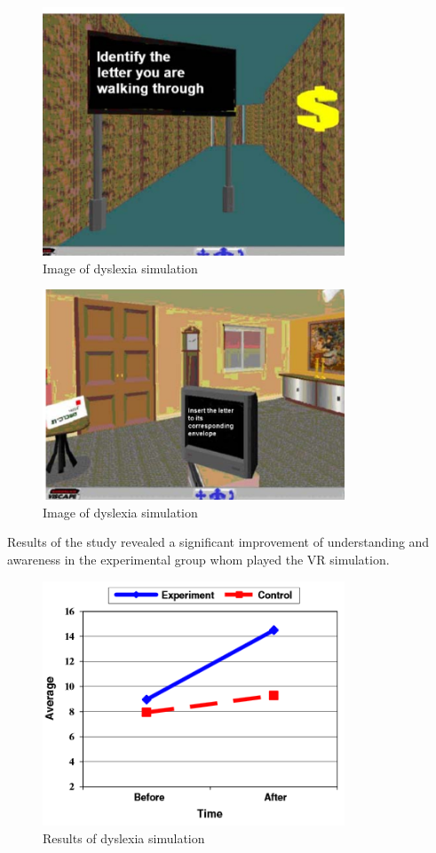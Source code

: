 \documentclass[11pt]{report}
\begin{document}
\begin{figure}[H]
\centering
\includegraphics[width=90mm]{images/litreview/dsim1.png}
\caption{Image of dyslexia simulation}
\label{autisim1}
\end{figure}

\begin{figure}[H]
\centering
\includegraphics[width=90mm]{images/litreview/dsim2.png}
\caption{Image of dyslexia simulation}
\label{autisim1}
\end{figure}

Results of the study revealed a significant improvement of understanding and awareness in the experimental group whom played the VR simulation.

\begin{figure}[H]
\centering
\includegraphics[width=90mm]{images/litreview/dsimresults.png}
\caption{Results of dyslexia simulation}
\label{autisim1}
\end{figure}
\end{document}

